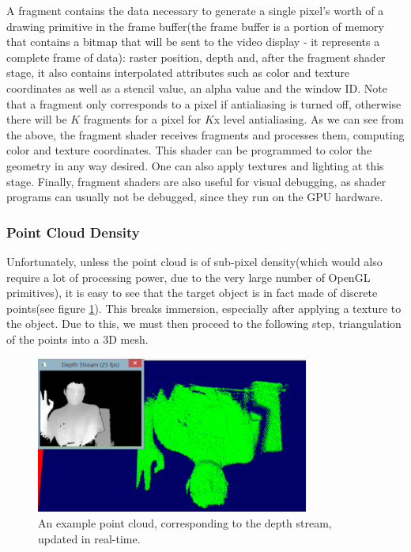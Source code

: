 \documentclass[]{article}
\begin{document}
A fragment contains the data necessary to generate a single pixel's worth of a drawing primitive in the frame buffer(the frame buffer is a portion of memory that contains a bitmap that will be sent to the video display - it represents a complete frame of data): raster position, depth and, after the fragment shader stage, it also contains interpolated attributes such as color and texture coordinates as well as a stencil value, an alpha value and the window ID. Note that a fragment only corresponds to a pixel if antialiasing is turned off, otherwise there will be $K$ fragments for a pixel for $K$x level antialiasing.
As we can see from the above, the fragment shader receives fragments and processes them, computing color and texture coordinates. This shader can be programmed to color the geometry in any way desired. One can also apply textures and lighting at this stage. Finally, fragment shaders are also useful for visual debugging, as shader programs can usually not be debugged, since they run on the GPU hardware.\\

\subsubsection{Point Cloud Density}

Unfortunately, unless the point cloud is of sub-pixel density(which would also require a lot of processing power, due to the very large number of OpenGL primitives), it is easy to see that the target object is in fact made of discrete points(see figure \ref{fig:PointCloud}). This breaks immersion, especially after applying a texture to the object. Due to this, we must then proceed to the following step, triangulation of the points into a 3D mesh.

\begin{figure}[hbtp]
    \centering
    \includegraphics[width=0.8\textwidth]{figures/PointCloud.PNG}
    \caption{An example point cloud, corresponding to the depth stream, updated in real-time.}
    \label{fig:PointCloud}
\end{figure}
\end{document}
